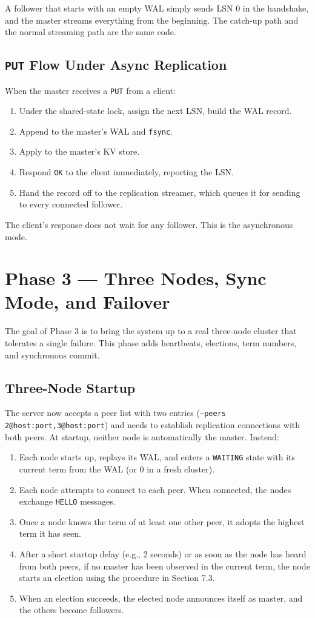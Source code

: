 \documentclass[11pt,a4paper]{article}
\begin{document}
A follower that starts with an empty WAL simply sends LSN 0 in the handshake, and the master streams everything from the beginning. The catch-up path and the normal streaming path are the same code.

\subsection{\texttt{PUT} Flow Under Async Replication}
When the master receives a \texttt{PUT} from a client:

\begin{enumerate}
\item Under the shared-state lock, assign the next LSN, build the WAL record.
\item Append to the master's WAL and \texttt{fsync}.
\item Apply to the master's KV store.
\item Respond \texttt{OK} to the client immediately, reporting the LSN.
\item Hand the record off to the replication streamer, which queues it for sending to every connected follower.
\end{enumerate}

The client's response does not wait for any follower. This is the asynchronous mode.

\section{Phase 3 --- Three Nodes, Sync Mode, and Failover}

The goal of Phase 3 is to bring the system up to a real three-node cluster that tolerates a single failure. This phase adds heartbeats, elections, term numbers, and synchronous commit.

\subsection{Three-Node Startup}
The server now accepts a peer list with two entries (\texttt{--peers 2@host:port,3@host:port}) and needs to establish replication connections with both peers. At startup, neither node is automatically the master. Instead:

\begin{enumerate}
\item Each node starts up, replays its WAL, and enters a \texttt{WAITING} state with its current term from the WAL (or 0 in a fresh cluster).
\item Each node attempts to connect to each peer. When connected, the nodes exchange \texttt{HELLO} messages.
\item Once a node knows the term of at least one other peer, it adopts the highest term it has seen.
\item After a short startup delay (e.g., 2 seconds) or as soon as the node has heard from both peers, if no master has been observed in the current term, the node starts an election using the procedure in Section 7.3.
\item When an election succeeds, the elected node announces itself as master, and the others become followers.
\end{enumerate}
\end{document}
